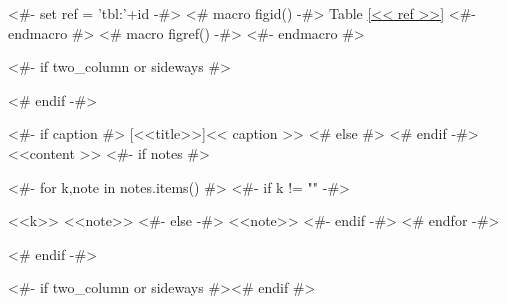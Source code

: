 <#- set ref = 'tbl:'+id -#>
<# macro figid() -#>
Table \ref{<< ref >>}
<#- endmacro #>
<# macro figref() -#>
\color{light-gray}
<#- endmacro #>

\begin{samepage}
\nopagebreak
<#- if two_column or sideways #>
\begin{adjustbox}{width=\textwidth,center}
<# endif -#>
\begin{threeparttable}
  <#- if caption #>
  [<<title>>]{<< caption >>}
  <# else #>
  <# endif -#>\label{<< ref >>}
  <<content >>
  <#- if notes #>
  \begin{tablenotes}
    <#- for k,note in notes.items() #>
    <#- if k != "" -#>
    \item [<<k>>] <<note>>
    <#- else -#>
    <<note>>
    <#- endif -#>
    <# endfor -#>
  \end{tablenotes}
  <# endif -#>
\end{threeparttable}
<#- if two_column or sideways #>\end{adjustbox}<# endif #>
\end{samepage}
\pagebreak

